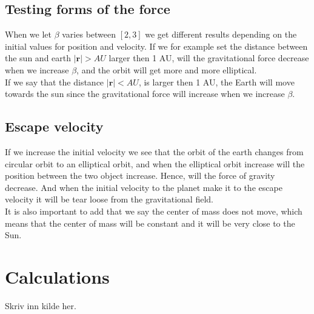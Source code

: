 \documentclass{article}
\begin{document}
\begin{multicols}{2}
\subsection{Testing forms of the force}
When we let $\beta$ varies between $[2,3]$ we get different results depending on the initial values for position and velocity. If we for example set the distance between the sun and earth $|\mathbf{r}|>AU$ larger then 1 AU, will the gravitational force decrease when we increase $\beta$, and the orbit will get more and more elliptical. \\
If we say that the distance $|\mathbf{r}|<AU$, is larger then 1 AU, the Earth will move towards the sun since the gravitational force will increase when we increase $\beta$.    
\subsection{Escape velocity}
If we increase the initial velocity we see that the orbit of the earth changes from circular orbit to an elliptical orbit, and when the elliptical orbit increase will the position between the two object increase. Hence, will the force of gravity decrease. And when the initial velocity to the planet make it to the escape velocity it will be tear loose from the gravitational field.\\
It is also important to add that we say the center of mass does not move, which means that the center of mass will be constant and it will be very close to the Sun.  
\end{multicols}



\clearpage
\appendix %
\section{Calculations} 

\begin{thebibliography}{9}
	Skriv inn kilde her.
\end{thebibliography}
\end{document}
